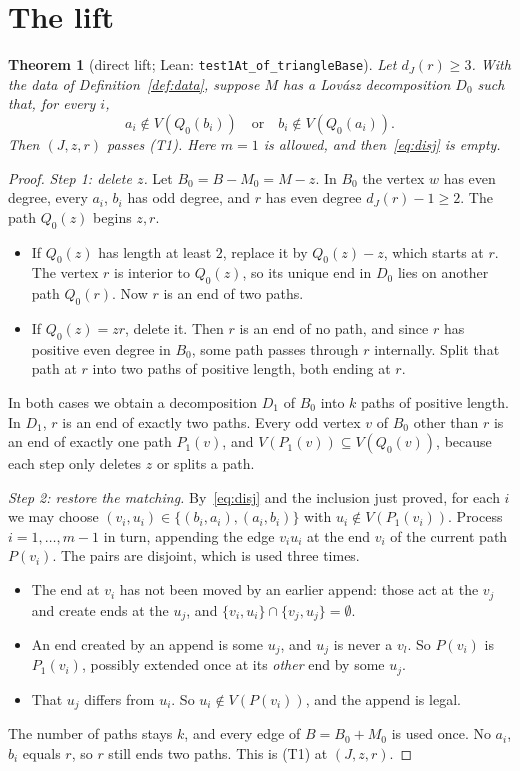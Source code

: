 \documentclass[11pt]{amsart}
\newtheorem{theorem}{Theorem}[section]
\theoremstyle{definition}
\begin{document}
\section{The lift}

\begin{theorem}[direct lift; Lean: \texttt{test1At\_of\_triangleBase}]\label{thm:lift}
Let $d_J(r)\ge3$. With the data of Definition~\ref{def:data}, suppose $M$ has a Lov\'asz
decomposition $D_0$ such that, for every $i$,
\begin{equation}\label{eq:disj}
a_i\notin V(Q_0(b_i)) \quad\text{or}\quad b_i\notin V(Q_0(a_i)).
\end{equation}
Then $(J,z,r)$ passes (T1). Here $m=1$ is allowed, and then~\eqref{eq:disj} is empty.
\end{theorem}

\begin{proof}
\emph{Step 1: delete $z$.} Let $B_0=B-M_0=M-z$. In $B_0$ the vertex $w$ has even degree, every $a_i$,
$b_i$ has odd degree, and $r$ has even degree $d_J(r)-1\ge 2$. The path $Q_0(z)$ begins $z,r$.
\begin{itemize}[leftmargin=*]
\item If $Q_0(z)$ has length at least $2$, replace it by $Q_0(z)-z$, which starts at $r$. The vertex
$r$ is interior to $Q_0(z)$, so its unique end in $D_0$ lies on another path $Q_0(r)$. Now $r$ is an end
of two paths.
\item If $Q_0(z)=zr$, delete it. Then $r$ is an end of no path, and since $r$ has positive even degree
in $B_0$, some path passes through $r$ internally. Split that path at $r$ into two paths of positive
length, both ending at $r$.
\end{itemize}
In both cases we obtain a decomposition $D_1$ of $B_0$ into $k$ paths of positive length. In $D_1$, $r$
is an end of exactly two paths. Every odd vertex $v$ of $B_0$ other than $r$ is an end of exactly one
path $P_1(v)$, and $V(P_1(v))\subseteq V(Q_0(v))$, because each step only deletes $z$ or splits a path.

\emph{Step 2: restore the matching.} By~\eqref{eq:disj} and the inclusion just proved, for each $i$ we
may choose $(v_i,u_i)\in\{(b_i,a_i),(a_i,b_i)\}$ with $u_i\notin V(P_1(v_i))$. Process $i=1,\dots,m-1$ in
turn, appending the edge $v_iu_i$ at the end $v_i$ of the current path $P(v_i)$. The pairs are disjoint,
which is used three times.
\begin{itemize}[leftmargin=*]
\item The end at $v_i$ has not been moved by an earlier append: those act at the $v_j$ and create ends
at the $u_j$, and $\{v_i,u_i\}\cap\{v_j,u_j\}=\emptyset$.
\item An end created by an append is some $u_j$, and $u_j$ is never a $v_l$. So $P(v_i)$ is $P_1(v_i)$,
possibly extended once at its \emph{other} end by some $u_j$.
\item That $u_j$ differs from $u_i$. So $u_i\notin V(P(v_i))$, and the append is legal.
\end{itemize}
The number of paths stays $k$, and every edge of $B=B_0+M_0$ is used once. No $a_i$, $b_i$ equals $r$,
so $r$ still ends two paths. This is (T1) at $(J,z,r)$.
\end{proof}
\end{document}
